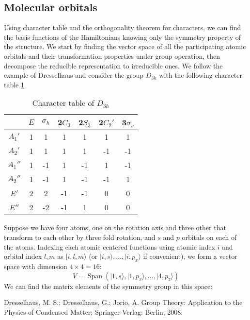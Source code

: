 \documentclass{article}
\DeclareMathOperator{\spn}{Span}
\begin{document}
\subsection{Molecular orbitals}
Using character table and the orthogonality theorem for characters, we can find the basis functions 
of the Hamiltonians knowing only the symmetry property of the structure. 
We start by finding the vector space of all the participating atomic orbitals and their transformation 
properties under group operation, then decompose the reducible representation to irreducible ones. 
We follow the example of Dresselhaus\cite{Dresselhaus2008} and consider the group $D_{3h}$ with 
the following character table \ref{T:ct}
\begin{table}[h!]
    \centering
    \caption{Character table of $D_{3h}$}
    \begin{tabular}{|c|c|c|c|c|c|c|}
                & $E$ & $\sigma_h$ & 2$C_3$ & 2$S_3$ & 2$C_2'$ & 3$\sigma_v$ \\ \hline
         $A_1'$ &  1  &  1         &  1     &  1     &   1     &   1         \\
         $A_2'$ &  1  &  1         &  1     &  1     &  -1     &  -1         \\
         $A_1''$&  1  & -1         &  1     & -1     &   1     &  -1         \\
         $A_2''$&  1  & -1         &  1     & -1     &  -1     &   1         \\
         $E'$   &  2  &  2         &  -1    & -1     &   0     &   0         \\
         $E''$  &  2  & -2         &  -1    &  1     &   0     &   0         \\ \hline
    \end{tabular}
    \label{T:ct}
\end{table}
Suppose we have four atoms, one on the rotation axis and three other that transform to each other 
by three fold rotation, and $s$ and $p$ orbitals on each of the atoms. Indexing each atomic 
centered functions using atomic index $i$ and orbital index $l,m$ as $| i,l,m \rangle$ 
(or $| i,s \rangle, \dots, |i,p_x\rangle$ if convenient), we form 
a vector space with dimension $4\times4 = 16$:
\begin{equation}
    V = \spn(| 1,s \rangle, | 1,p_x \rangle ,\dots, | 4,p_z \rangle)
\end{equation}
We can find the matrix elements of the symmetry group in this space:


\begin{thebibliography}{99}
    Dresselhaus, M. S.; Dresselhaus, G.; Jorio, A. Group Theory: Application to the Physics of Condensed Matter; Springer-Verlag: Berlin, 2008.
\end{thebibliography}

\appendix 
\section{}
\end{document}
